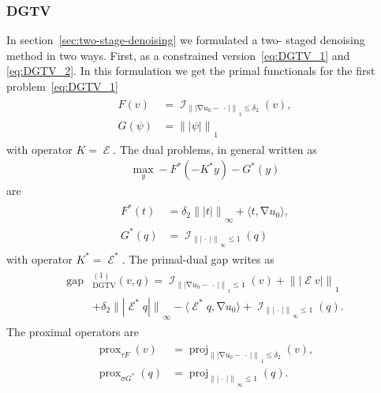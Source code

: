 \documentclass[twocolumn,envcountsame]{svjour3}
\newcommand{\norm}[2][]{{\|{#2}\|_{}}_{#1}}
\newcommand{\abs}[1]{|#1|}
\newcommand{\scp}[2]{\langle #1,#2\rangle}
\newcommand{\dummy}{\,\cdot\,}
\DeclareMathOperator{\ind}{\mathcal{I}}
\DeclareMathOperator{\prox}{prox}
\DeclareMathOperator{\proj}{proj}
\DeclareMathOperator{\gap}{gap}
\DeclareMathOperator{\grad}{\nabla}
\DeclareMathOperator{\symgrad}{\mathcal{E}}
\DeclareMathOperator{\DGTV}{DGTV}
\begin{document}
\subsubsection{DGTV}
\label{subsec:DGTV}
%
In section~\ref{sec:two-stage-denoising} we formulated a two-
staged denoising method in two ways. 
First, as a constrained version~\eqref{eq:DGTV_1} and~
\eqref{eq:DGTV_2}. 
In this formulation we get the primal functionals for the first problem~\eqref{eq:DGTV_1}
\begin{align}\label{eq:primalDGTVconstraint}
\begin{split}
	F(v) &= \ind_{\norm[1]{\abs{\grad u_0 -\dummy}}
		\leq \delta_2}(v),\\
	G(\psi) &= \norm[1]{\abs{\psi}}
\end{split}
\end{align}
with operator $K = \symgrad$.
The dual problems, in general written as 
\begin{align*}\max_y -F^*(-K^*y)-G^*(y)\end{align*} are
\begin{align}\label{eq:dualDGTVconstraint}
\begin{split}
	F^*(t) &= \delta_2\norm[\infty]{\abs{t}} 
			+ \scp{t}{\grad u_0},\\
	G^*(q) &= \ind_{\norm[\infty]{\abs{\dummy}}\leq 1}(q)
\end{split}
\end{align}
with operator $K^* = \symgrad^*$.
The primal-dual gap writes as
\begin{align}\label{eq:gapDGTVconstraint}
\begin{split}
	\gap&_{\DGTV}^{(1)}(v,q) 
	= \ind_{\norm[1]{\abs{\grad u_0 - \dummy}}\leq 1}(v) 
		+ \norm[1]{\abs{\symgrad v}}\\
		&+ \delta_2\norm[\infty]{\abs{\symgrad^* q}}
		- \scp{\symgrad^* q}{\grad u_0}
		+ \ind_{\norm[\infty]{\abs{\dummy}}\leq 1}(q).
\end{split}
\end{align}
The proximal operators are
\begin{align}\label{eq:proxDGTVconstraint}
\begin{split}
	\prox_{\tau  F}(v) 
	&= \proj_{\norm[1]{\abs{\grad u_0 - \dummy}}
		\leq \delta_2}(v),\\
	\prox_{\sigma G^*}(q)
	&= \proj_{\norm[\infty]{\abs{\dummy}}\leq 1}(q).
\end{split}
\end{align}
\end{document}
